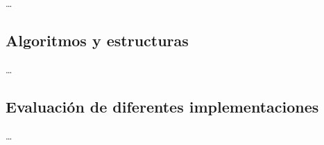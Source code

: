 \fim\ldots


\subsection{Algoritmos y estructuras}
\ldots





\subsection{Evaluación de diferentes implementaciones}
\ldots



